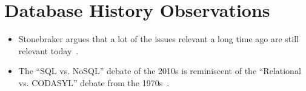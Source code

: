\documentclass[11pt]{article}
\begin{document}
\maketitle
\thispagestyle{plain}


\section{Database History Observations}
\begin{itemize}
    \item
    Stonebraker argues that a lot of the issues relevant a long time ago are still relevant 
    today~\cite{stonebraker2005goes}.
    
    \item
    The ``SQL vs. NoSQL'' debate of the 2010s is reminiscent of the ``Relational vs. 
    CODASYL'' debate from the 1970s~\cite{michaels76}.
\end{itemize}
\end{document}

